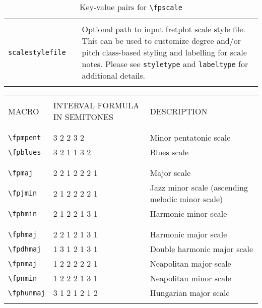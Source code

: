 \documentclass[12pt,letterpaper]{article}
\begin{document}
\begin{table}[H]
\begin{tabular}{|l|l|p{8cm}|}
\hline

&&\\
\texttt{scalestylefile} &  & Optional path to input fretplot scale style file. This can be used to customize degree and/or pitch class-based styling and labelling for scale notes. Please see \texttt{styletype} and \texttt{labeltype} for additional details.\\
&&\\

\hline
\end{tabular}\caption{Key-value pairs for \texttt{\textbackslash fpscale}}\end{table}
\normalsize

\begin{table}[H]\tiny\begin{tabular}{|l|l|l|}
\hline

&&\\
MACRO & INTERVAL FORMULA IN SEMITONES & DESCRIPTION\\
&&\\

\hline

&&\\
\texttt{\textbackslash fpmpent} & 3 2 2 3 2 & Minor pentatonic scale\\
\texttt{\textbackslash fpblues} & 3 2 1 1 3 2 & Blues scale\\
&&\\

\hline

&&\\
\texttt{\textbackslash fpmaj} & 2 2 1 2 2 2 1 & Major scale\\
\texttt{\textbackslash fpjmin} & 2 1 2 2 2 2 1 & Jazz minor scale (ascending melodic minor scale)\\
\texttt{\textbackslash fphmin} & 2 1 2 2 1 3 1 & Harmonic minor scale\\
&&\\

\hline

&&\\
\texttt{\textbackslash fphmaj} & 2 2 1 2 1 3 1 & Harmonic major scale\\
\texttt{\textbackslash fpdhmaj} & 1 3 1 2 1 3 1 & Double harmonic major scale\\
\texttt{\textbackslash fpnmaj} & 1 2 2 2 2 2 1 & Neapolitan major scale\\
\texttt{\textbackslash fpnmin} & 1 2 2 2 1 3 1 & Neapolitan minor scale\\
\texttt{\textbackslash fphunmaj} & 3 1 2 1 2 1 2 & Hungarian major scale\\
&&\\


\end{tabular}
\end{table}
\end{document}
